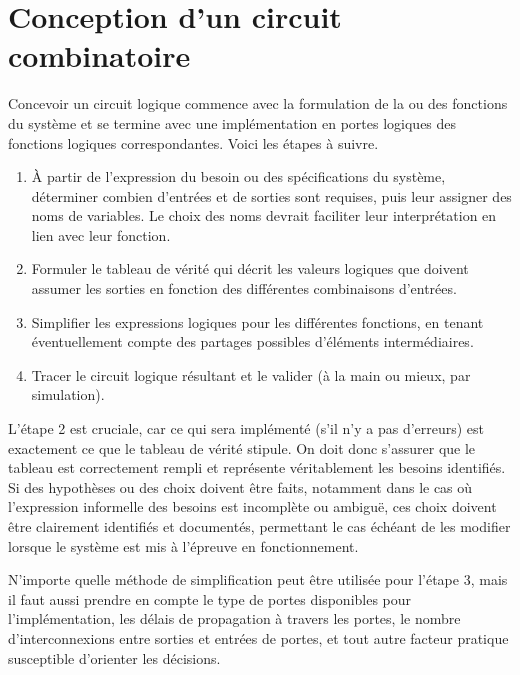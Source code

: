 \documentclass[letter, oneside]{book}
\begin{document}
\section{Conception d'un circuit combinatoire}
\label{sec:org5b9ef5f}

Concevoir un circuit logique commence avec la formulation de la ou des
fonctions du système et se termine avec une implémentation en portes
logiques des fonctions logiques correspondantes. Voici les étapes à
suivre.

\begin{enumerate}
\item À partir de l'expression du besoin ou des spécifications du
système, déterminer combien d'entrées et de sorties sont
requises, puis leur assigner des noms de variables. Le choix des noms
devrait faciliter leur interprétation en lien avec leur fonction.

\item Formuler le tableau de vérité qui décrit les valeurs logiques que
doivent assumer les sorties en fonction des différentes
combinaisons d'entrées.

\item Simplifier les expressions logiques pour les différentes fonctions,
en tenant éventuellement compte des partages possibles d'éléments
intermédiaires.

\item Tracer le circuit logique résultant et le valider (à la main ou
mieux, par simulation).
\end{enumerate}

L'étape 2 est cruciale, car ce qui sera implémenté (s'il n'y a pas
d'erreurs) est exactement ce que le tableau de vérité stipule. On
doit donc s'assurer que le tableau est correctement rempli et
représente véritablement les besoins identifiés. Si des hypothèses ou
des choix doivent être faits, notamment dans le cas où l'expression
informelle des besoins est incomplète ou ambiguë, ces choix doivent
être clairement identifiés et documentés, permettant le cas échéant de
les modifier lorsque le système est mis à l'épreuve en fonctionnement.

N'importe quelle méthode de simplification peut être utilisée pour
l'étape 3, mais il faut aussi prendre en compte le type de portes
disponibles pour l'implémentation, les délais de propagation à
travers les portes, le nombre d'interconnexions entre sorties et
entrées de portes, et tout autre facteur pratique susceptible
d'orienter les décisions.
\end{document}
